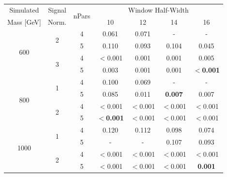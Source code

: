 \begin{table}[!hb]
\vspace{0.5em}
\centering
\begin{tabular}{|c|c|c||c|c|c|c|}
\hline
      Simulated      & Signal             & \multirow{2}{*}{nPars} &\multicolumn{4}{c|}{Window Half-Width} \\ \cline{4-7} 
      Mass [GeV]     & Norm.     &                        &      10        &      12        &      14        &      16        \\ \hline
      \multirow{4}{*}{600}&       \multirow{2}{*}{2}              &           4            &   0.061    &   0.071    &     -      &     -      \\
                     &                           &           5            &   0.110    &   0.093    &   0.104    &   0.045    \\ \cline{2-7}
                     &            \multirow{2}{*}{3}              &           4            &   $<$0.001 &   0.001    &   0.001    &   0.005    \\
                     &                           &           5            &   0.003    &   0.001    &   0.001    &  \textbf{$<$0.001} \\ \hline
      \multirow{4}{*}{800}&       \multirow{2}{*}{1}              &           4            &   0.100    &   0.069    &     -      &     -      \\
                     &                           &           5            &   0.085    &   0.011    &   \textbf{0.007}    &   0.007    \\ \cline{2-7}
                     &            \multirow{2}{*}{2}              &           4            &   $<$0.001 &   $<$0.001 &   $<$0.001 &   $<$0.001  \\
                     &                           &           5            &   \textbf{$<$0.001} &   $<$0.001 &   $<$0.001 &   $<$0.001  \\ \hline
       \multirow{4}{*}{1000}&     \multirow{2}{*}{1}              &           4            &   0.120    &   0.112    &   0.098    &   0.074    \\
                     &                           &           5            &     -      &     -      &   0.107    &   0.093    \\ \cline{2-7}
                     &            \multirow{2}{*}{2}              &           4            &   $<$0.001 &   $<$0.001 &   $<$0.001 &   $<$0.001  \\
                     &                           &           5            &   $<$0.001 &   $<$0.001 &   $<$0.001 &   \textbf{0.001}    \\
\hline
\end{tabular}


\end{table}
